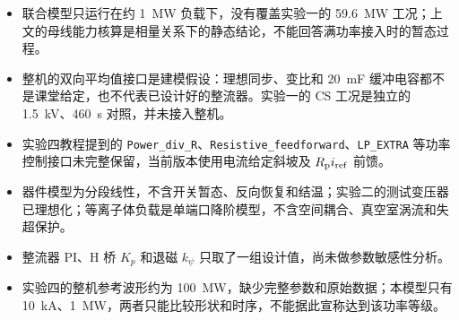 \begin{itemize}
  \item 联合模型只运行在约 1~MW 负载下，没有覆盖实验一的 59.6~MW 工况；上文的母线能力核算是相量关系下的静态结论，不能回答满功率接入时的暂态过程。
  \item 整机的双向平均值接口是建模假设：理想同步、变比和 20~mF 缓冲电容都不是课堂给定，也不代表已设计好的整流器。实验一的 CS 工况是独立的 1.5~kV、460~s 对照，并未接入整机。
  \item 实验四教程提到的 \texttt{Power\_div\_R}、\texttt{Resistive\_feedforward}、\texttt{LP\_EXTRA} 等功率控制接口未完整保留，当前版本使用电流给定斜坡及 $R_{\mathrm{p}}i_{\mathrm{ref}}$ 前馈。
  \item 器件模型为分段线性，不含开关暂态、反向恢复和结温；实验二的测试变压器已理想化；等离子体负载是单端口降阶模型，不含空间耦合、真空室涡流和失超保护。
  \item 整流器 PI、H 桥 $K_p$ 和退磁 $k_\psi$ 只取了一组设计值，尚未做参数敏感性分析。
  \item 实验四的整机参考波形约为 100~MW，缺少完整参数和原始数据；本模型只有 10~kA、1~MW，两者只能比较形状和时序，不能据此宣称达到该功率等级。
\end{itemize}
